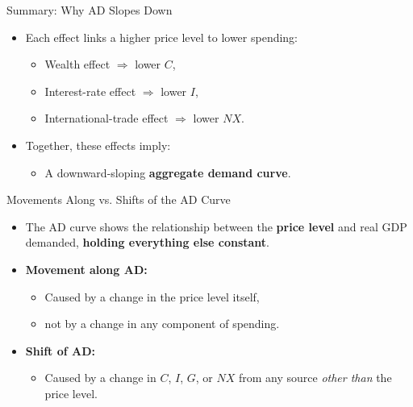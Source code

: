 \documentclass[aspectratio=169]{beamer}
\begin{document}
\begin{frame}{Summary: Why AD Slopes Down}
\transfade
\begin{itemize}[<+->]
  \item Each effect links a higher price level to lower spending:
  \begin{itemize}[<+->]
    \item Wealth effect \(\Rightarrow\) lower \(C\),
    \item Interest-rate effect \(\Rightarrow\) lower \(I\),
    \item International-trade effect \(\Rightarrow\) lower \(NX\).
  \end{itemize}
  \item Together, these effects imply:
  \begin{itemize}[<+->]
    \item A downward-sloping \textbf{aggregate demand curve}.
  \end{itemize}
\end{itemize}
\end{frame}


\begin{frame}{Movements Along vs. Shifts of the AD Curve}
\transfade
\begin{itemize}[<+->]
  \item The AD curve shows the relationship between the \textbf{price level} and real GDP demanded, \textbf{holding everything else constant}.
  \item \textbf{Movement along AD:}
  \begin{itemize}[<+->]
    \item Caused by a change in the price level itself,
    \item not by a change in any component of spending.
  \end{itemize}
  \item \textbf{Shift of AD:}
  \begin{itemize}[<+->]
    \item Caused by a change in \(C\), \(I\), \(G\), or \(NX\) from any source \emph{other than} the price level.
  \end{itemize}
\end{itemize}
\end{frame}

\end{document}
